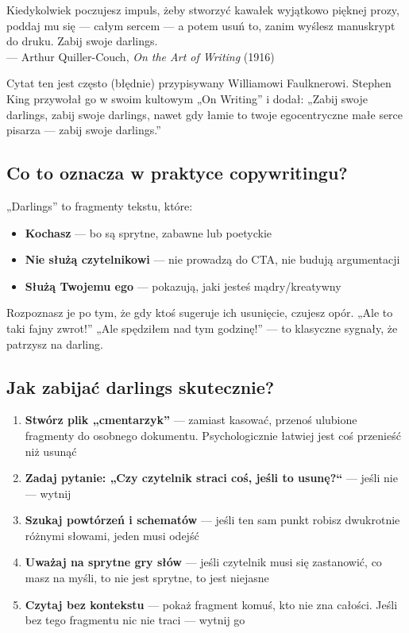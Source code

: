 \documentclass[
  12pt,
  a4paper,
  twoside,
  openright,
  12pt,
  DIV=12,
  BCOR=12mm]{scrbook}
\providecommand{\tightlist}{%
  \setlength{\itemsep}{0pt}\setlength{\parskip}{0pt}}\usepackage{longtable,booktabs,array}
\begin{document}
\begin{cytat}
Kiedykolwiek poczujesz impuls, żeby stworzyć kawałek wyjątkowo pięknej prozy, poddaj mu się --- całym sercem --- a potem usuń to, zanim wyślesz manuskrypt do druku. Zabij swoje darlings.\\
--- Arthur Quiller-Couch, \textit{On the Art of Writing} (1916)
\end{cytat}

Cytat ten jest często (błędnie) przypisywany Williamowi Faulknerowi.
Stephen King przywołał go w swoim kultowym „On Writing'' i dodał: „Zabij
swoje darlings, zabij swoje darlings, nawet gdy łamie to twoje
egocentryczne małe serce pisarza --- zabij swoje darlings.''

\subsection{Co to oznacza w praktyce
copywritingu?}\label{co-to-oznacza-w-praktyce-copywritingu}

„Darlings'' to fragmenty tekstu, które:

\begin{itemize}
\tightlist
\item
  \textbf{Kochasz} --- bo są sprytne, zabawne lub poetyckie
\item
  \textbf{Nie służą czytelnikowi} --- nie prowadzą do CTA, nie budują
  argumentacji
\item
  \textbf{Służą Twojemu ego} --- pokazują, jaki jesteś mądry/kreatywny
\end{itemize}

Rozpoznasz je po tym, że gdy ktoś sugeruje ich usunięcie, czujesz opór.
„Ale to taki fajny zwrot!'' „Ale spędziłem nad tym godzinę!'' --- to
klasyczne sygnały, że patrzysz na darling.

\subsection{Jak zabijać darlings
skutecznie?}\label{jak-zabijaux107-darlings-skutecznie}

\begin{enumerate}
\def\labelenumi{\arabic{enumi}.}
\tightlist
\item
  \textbf{Stwórz plik „cmentarzyk''} --- zamiast kasować, przenoś
  ulubione fragmenty do osobnego dokumentu. Psychologicznie łatwiej jest
  coś przenieść niż usunąć
\item
  \textbf{Zadaj pytanie: „Czy czytelnik straci coś, jeśli to usunę?{}``}
  --- jeśli nie --- wytnij
\item
  \textbf{Szukaj powtórzeń i schematów} --- jeśli ten sam punkt robisz
  dwukrotnie różnymi słowami, jeden musi odejść
\item
  \textbf{Uważaj na sprytne gry słów} --- jeśli czytelnik musi się
  zastanowić, co masz na myśli, to nie jest sprytne, to jest niejasne
\item
  \textbf{Czytaj bez kontekstu} --- pokaż fragment komuś, kto nie zna
  całości. Jeśli bez tego fragmentu nic nie traci --- wytnij go
\end{enumerate}
\end{document}
